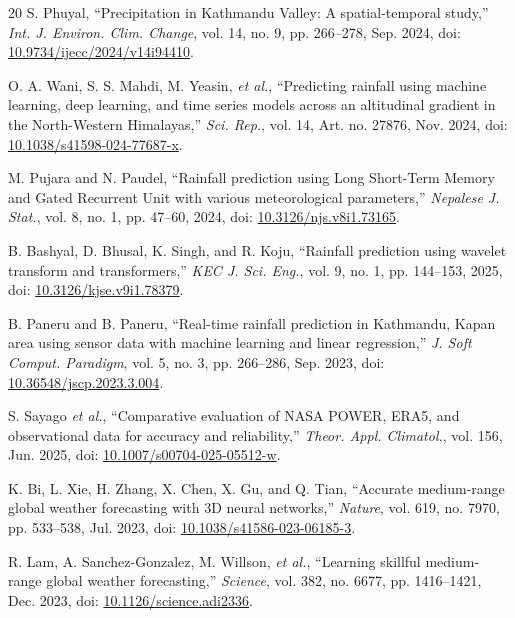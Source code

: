 \documentclass[10pt,twocolumn,a4paper]{article}
\begin{document}
\begin{thebibliography}{20}
 S. Phuyal, ``Precipitation in Kathmandu Valley: A spatial-temporal study,'' \textit{Int. J. Environ. Clim. Change}, vol. 14, no. 9, pp. 266--278, Sep. 2024, doi: \href{https://doi.org/10.9734/ijecc/2024/v14i94410}{10.9734/ijecc/2024/v14i94410}.

 O. A. Wani, S. S. Mahdi, M. Yeasin, \textit{et al.}, ``Predicting rainfall using machine learning, deep learning, and time series models across an altitudinal gradient in the North-Western Himalayas,'' \textit{Sci. Rep.}, vol. 14, Art. no. 27876, Nov. 2024, doi: \href{https://doi.org/10.1038/s41598-024-77687-x}{10.1038/s41598-024-77687-x}.

 M. Pujara and N. Paudel, ``Rainfall prediction using Long Short-Term Memory and Gated Recurrent Unit with various meteorological parameters,'' \textit{Nepalese J. Stat.}, vol. 8, no. 1, pp. 47--60, 2024, doi: \href{https://doi.org/10.3126/njs.v8i1.73165}{10.3126/njs.v8i1.73165}.

 B. Bashyal, D. Bhusal, K. Singh, and R. Koju, ``Rainfall prediction using wavelet transform and transformers,'' \textit{KEC J. Sci. Eng.}, vol. 9, no. 1, pp. 144--153, 2025, doi: \href{https://doi.org/10.3126/kjse.v9i1.78379}{10.3126/kjse.v9i1.78379}.

 B. Paneru and B. Paneru, ``Real-time rainfall prediction in Kathmandu, Kapan area using sensor data with machine learning and linear regression,'' \textit{J. Soft Comput. Paradigm}, vol. 5, no. 3, pp. 266--286, Sep. 2023, doi: \href{https://doi.org/10.36548/jscp.2023.3.004}{10.36548/jscp.2023.3.004}.

 S. Sayago \textit{et al.}, ``Comparative evaluation of NASA POWER, ERA5, and observational data for accuracy and reliability,'' \textit{Theor. Appl. Climatol.}, vol. 156, Jun. 2025, doi: \href{https://doi.org/10.1007/s00704-025-05512-w}{10.1007/s00704-025-05512-w}.

 K. Bi, L. Xie, H. Zhang, X. Chen, X. Gu, and Q. Tian, ``Accurate medium-range global weather forecasting with 3D neural networks,'' \textit{Nature}, vol. 619, no. 7970, pp. 533--538, Jul. 2023, doi: \href{https://doi.org/10.1038/s41586-023-06185-3}{10.1038/s41586-023-06185-3}.

 R. Lam, A. Sanchez-Gonzalez, M. Willson, \textit{et al.}, ``Learning skillful medium-range global weather forecasting,'' \textit{Science}, vol. 382, no. 6677, pp. 1416--1421, Dec. 2023, doi: \href{https://doi.org/10.1126/science.adi2336}{10.1126/science.adi2336}.


\end{thebibliography}
\end{document}
